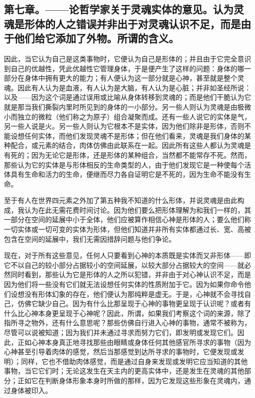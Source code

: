\subsection{第七章。——论哲学家关于灵魂实体的意见。认为灵魂是形体的人之错误并非出于对灵魂认识不足，而是由于他们给它添加了外物。所谓的含义。}

因此，当它认为自己是这类事物时，它便认为自己是形体的；并且由于它完全意识到自己的优越性，凭此优越性它管理身体，于是便产生了这样的问题：身体的哪一部分在身体中拥有更大的能力；有人便认为这一部分就是心神，甚至就是整个灵魂。因此有人认为是血液，有人认为是大脑，有人认为是心脏；并非如圣经所说：以及——因为这个词是通过误用或比喻从身体转移到灵魂的；而是他们干脆认为它就是那当我们撕裂内里时所见到的身体的一小部分。另一些人则认为灵魂是由极微小而独立的微粒（他们称之为原子）组合凝聚而成。还有一些人说它的实体是气，另一些人说是火。另一些人则认为它根本不是实体，因为他们除非是形体，否则不能设想任何实体，而他们发现灵魂不是形体；但在他们看来，灵魂是我们身体的某种配合，或元素的结合，肉体仿佛由此联系在一起。因此所有这些人都认为灵魂是有死的；因为无论它是形体，还是形体的某种组合，当然都不能常存不死。然而，那些认为它的实体是与形体相反的生命类型的人，由于他们发现它是一种使每个活体具有生命和活力的生命，便继而尽力各自证明它是不死的，因为生命不能没有生命。\par

至于有人在世界四元素之外加了第五种我不知道的什么形体，并说灵魂是由此构成，我认为在此无需花费时间讨论。因为他们要么把形体理解为和我们一样的，其一部分在空间的延展中小于全体，他们应被算作相信心神是形体的人；要么他们称一切实体或一切可变的实体为形体，但他们知道并非所有实体都通过长、宽、高被包含在空间的延展中，我们无需因措辞问题与他们争论。\par

现在，对于所有这些意见，任何人只要看到心神的本质既是实体而又非形体——即它不以自己的较小部分占据较小的空间延展，以较大部分占据较大的空间——就必然同时看到，那些认为它是形体的人之所以犯错，并非由于对心神认识不足，而是因为他们将一些没有它们就无法设想任何实体的性质附加于它。因为如果你命令他们设想没有形体幻象的存在，他们便认为那纯粹是虚无。于是，心神就不会寻找自己，仿佛它缺少自己。因为有什么比那呈现于心神的事物更呈现于认识呢？或者有什么比心神本身更呈现于心神呢？因此，所谓，如果我们考察这个词的来源，除了指所寻之物外，还有什么意思呢？那些仿佛自行进入心神的事物，通常不被称为，尽管可以说被知道；因为我们并未通过寻求而努力它们，即发明或发现它们。因此，正如心神本身真正地寻找那些由眼睛或身体任何其他感官所寻求的事物（因为心神甚至引导着肉体的感觉，然后当那感觉到达所寻求的事物时，它便发现或发明）；同样，它也不借助肉体感觉，而是通过自身来发现或发明它应当知道的其他事物，当它它们时；无论这发生在天主内的更高实体中，还是发生在灵魂的其他部分；正如它在判断身体形象本身时所做的那样，因为它发现这些形象在灵魂内，通过身体被印入。\par

